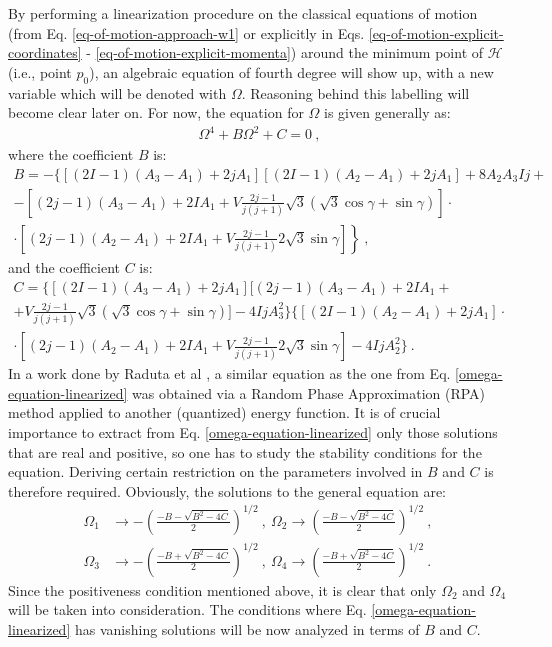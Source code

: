 By performing a linearization procedure on the classical equations of motion (from Eq. \ref{eq-of-motion-approach-w1} or explicitly in Eqs. \ref{eq-of-motion-explicit-coordinates} - \ref{eq-of-motion-explicit-momenta}) around the minimum point of $\mathcal{H}$ (i.e., point $p_0$), an algebraic equation of fourth degree will show up, with a new variable which will be denoted with $\Omega$. Reasoning behind this labelling will become clear later on. For now, the equation for $\Omega$ is given generally as:
\begin{align}
    \Omega^4+B\Omega^2+C=0\ ,
    \label{omega-equation-linearized}
\end{align}
where the coefficient $B$ is:
\begin{multline}
    B=-\bigg\{\left[ (2I-1)(A_3-A_1)+2jA_1\right]\left[(2I-1)(A_2-A_1)+2jA_1\right]+8A_2A_3Ij+\\
    -\left[(2j-1)(A_3-A_1)+2IA_1+V\frac{2j-1}{j(j+1)}\sqrt{3}\left(\sqrt{3}\cos\gamma+\sin\gamma\right)\right]\cdot\\
    \left.\cdot\left[(2j-1)(A_2-A_1)+2IA_1+V\frac{2j-1}{j(j+1)}2\sqrt{3}\sin\gamma\right]\right\}\ ,
    \label{omega-B-term}
\end{multline}
and the coefficient $C$ is:
\begin{multline}
    C=\bigg\{\left[(2I-1)(A_3-A_1)+2jA_1\right]\bigg[(2j-1)(A_3-A_1)+2IA_1+\\
    +V\frac{2j-1}{j(j+1)}\sqrt{3}(\sqrt{3}\cos\gamma+\sin\gamma)\bigg]-4IjA_3^2\bigg\}\bigg\{\left[(2I-1)(A_2-A_1)+2jA_1\right]\cdot\\
    \cdot\left[(2j-1)(A_2-A_1)+2IA_1+V\frac{2j-1}{j(j+1)}2\sqrt{3}\sin\gamma\right]-4IjA_2^2\bigg\}\ .
    \label{omega-C-term}
\end{multline}
In a work done by Raduta et al \cite{raduta2017semiclassical}, a similar equation as the one from Eq. \ref{omega-equation-linearized} was obtained via a Random Phase Approximation (RPA) method applied to another (quantized) energy function. It is of crucial importance to extract from Eq. \ref{omega-equation-linearized} only those solutions that are real and positive, so one has to study the stability conditions for the equation. Deriving certain restriction on the parameters involved in $B$ and $C$ is therefore required. Obviously, the solutions to the general equation are:
\begin{align}
    \Omega_1 &\to -\left(\frac{-B-\sqrt{B^2-4 C}}{2}\right)^{1/2}\ ,\ \Omega_2 \to \left(\frac{-B-\sqrt{B^2-4 C}}{2}\right)^{1/2}\ , \nonumber\ \\
    \Omega_3 &\to -\left(\frac{-B+\sqrt{B^2-4 C}}{2}\right)^{1/2}\ ,\ \Omega_4 \to \left(\frac{-B+\sqrt{B^2-4 C}}{2}\right)^{1/2}\ .
\end{align}
Since the positiveness condition mentioned above, it is clear that only $\Omega_2$ and $\Omega_4$ will be taken into consideration. The conditions where Eq. \ref{omega-equation-linearized} has vanishing solutions will be now analyzed in terms of $B$ and $C$.

